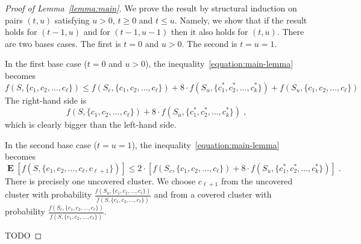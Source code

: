\documentclass{article}
\DeclareMathOperator*{\Exp}{\mathbf{E}}
\begin{document}
\begin{proof}[Proof of Lemma~\ref{lemma:main}]
We prove the result by structural induction on pairs $(t,u)$ satisfying $u > 0$,
$t \ge 0$ and $t \le u$. Namely, we show that if the result holds for $(t-1, u)$
and for $(t-1, u-1)$ then it also holds for $(t,u)$. There are two bases cases.
The first is $t=0$ and $u > 0$. The second is $t=u=1$.

In the first base case ($t=0$ and $u > 0$), the inequality~\eqref{equation:main-lemma} becomes
$$
f(S, \{c_1, c_2, \dots, c_\ell\})
\le f(S_c, \{c_1, c_2, \dots, c_\ell\}) + 8 \cdot f(S_u, \{c^*_1, c^*_2, \dots, c^*_k\}) + f(S_u, \{c_1, c_2, \dots, c_\ell\})
$$
The right-hand side is
$$
f(S, \{c_1, c_2, \dots, c_\ell\}) + 8 \cdot f(S_u, \{c^*_1, c^*_2, \dots, c^*_k\}) \; ,
$$
which is clearly bigger than the left-hand side.

In the second base case ($t=u=1$), the inequality~\eqref{equation:main-lemma} becomes
$$
\Exp[f(S, \{c_1, c_2, \dots, c_\ell, c_{\ell+1}\})] \le 2 \cdot \left[f(S_c, \{c_1, c_2, \dots, c_\ell\}) + 8 \cdot f(S_u, \{c^*_1, c^*_2, \dots, c^*_k\} ) \right] \; .
$$
There is precisely one uncovered cluster. We choose $c_{\ell+1}$ from the
uncovered cluster with probability $\frac{f(S_u, \{c_1, c_2, \dots, c_\ell\})}{f(S,
\{c_1, c_2, \dots, c_\ell\})}$ and from a covered cluster with probability
$\frac{f(S_c, \{c_1, c_2, \dots, c_\ell\})}{f(S, \{c_1, c_2, \dots, c_\ell\})}$.

TODO
\end{proof}
\end{document}
